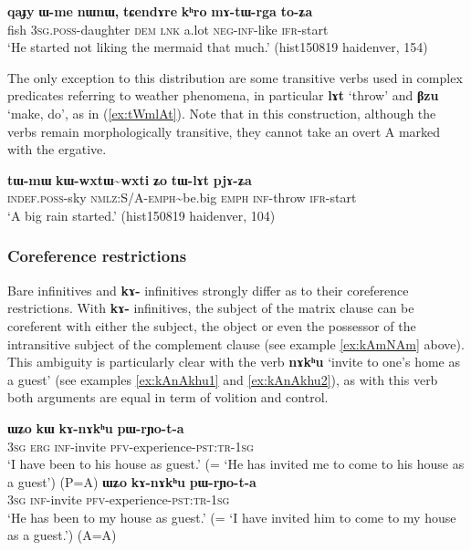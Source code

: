 \documentclass[oneside,a4paper,11pt]{article}
\newcommand{\ipa}[1]{\textbf{\phon#1}} %
\newcommand{\tld}{\textasciitilde{}}
\begin{document}
\begin{exe}
\ex  \label{ex:mAtWrga}
\gll \ipa{qaɟy} 	\ipa{ɯ-me} 	\ipa{nɯnɯ,} 	\ipa{tɕendɤre} 	\ipa{kʰro} 	\ipa{mɤ-tɯ-rga} 	\ipa{to-ʑa} \\
fish \textsc{3sg.poss}-daughter \textsc{dem} \textsc{lnk} a.lot \textsc{neg-inf}-like \textsc{ifr}-start \\
\glt `He started not liking the mermaid that much.' (hist150819 haidenver, 154)
\end{exe}
 
The only exception to this distribution are some transitive verbs used in complex predicates referring to weather phenomena, in particular \ipa{lɤt} `throw' and \ipa{βzu} `make, do', as in (\ref{ex:tWmlAt}). Note that in this construction, although the verbs remain morphologically transitive, they cannot take an overt A marked with the ergative.
 
\begin{exe}
\ex  \label{ex:tWmlAt}
\gll
\ipa{tɯ-mɯ} 	\ipa{kɯ-wxtɯ\tld{}wxti} 	\ipa{ʑo} 	\ipa{tɯ-lɤt} 	\ipa{pjɤ-ʑa} \\
\textsc{indef.poss}-sky \textsc{nmlz:S/A-emph}\tld{}be.big \textsc{emph} \textsc{inf}-throw \textsc{ifr}-start \\
\glt `A big rain started.' (hist150819 haidenver, 104)
\end{exe}



\subsubsection{Coreference restrictions} \label{sec:inf.rYo}
Bare infinitives and \ipa{kɤ-} infinitives strongly differ as to their coreference restrictions. With \ipa{kɤ-} infinitives, the subject of the matrix clause can be coreferent with either the subject, the object or even the possessor of the intransitive subject of the complement clause (see example \ref{ex:kAmNAm} above). This ambiguity is particularly clear with the verb \ipa{nɤkʰu} `invite to one's home as a guest' (see examples \ref{ex:kAnAkhu1} and \ref{ex:kAnAkhu2}), as with this verb both arguments are equal in term of volition and control.

\begin{exe}
\ex  \label{ex:kAnAkhu1}
\gll
\ipa{ɯʑo} 	\ipa{kɯ} 	\ipa{kɤ-nɤkʰu} 	\ipa{pɯ-rɲo-t-a} \\
\textsc{3sg} \textsc{erg} \textsc{inf}-invite \textsc{pfv}-experience-\textsc{pst:tr-1sg} \\
\glt `I have been to his house as guest.'  (= `He has invited me to come to his house as a guest') (P=A)
\ex  \label{ex:kAnAkhu2}
\gll
\ipa{ɯʑo} 	\ipa{kɤ-nɤkʰu} 	\ipa{pɯ-rɲo-t-a} \\
\textsc{3sg}  \textsc{inf}-invite \textsc{pfv}-experience-\textsc{pst:tr-1sg} \\
\glt `He has been to my house as guest.' (= `I have invited him to come to my house as a guest.') (A=A)
\end{exe}
\end{document}
